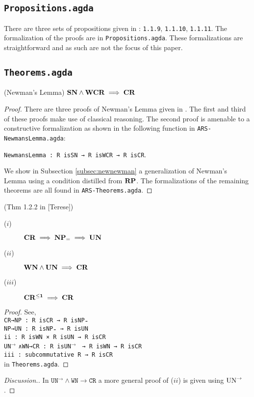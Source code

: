 \subsection{\texttt{Propositions.agda}}
There are three sets of propositions given in \terese: \texttt{1.1.9}, \texttt{1.1.10}, \texttt{1.1.11}.
The formalization of the proofs are in \texttt{Propositions.agda}. These formalizations are straightforward
and as such are not the focus of this paper.

\subsection{\texttt{Theorems.agda}} \label{subsec:theorems}

\begin{theorem}(Newman's Lemma)
  $\mathbf{SN} \land \mathbf{WCR} \implies \mathbf{CR}$
\end{theorem}

\begin{proof}
  There are three proofs of Newman's Lemma given in \terese.
  The first and third of these proofs make use of classical reasoning. The second proof is amenable to a
  constructive formalization as shown in the following function in \texttt{ARS-NewmansLemma.agda}:

  \verb|NewmansLemma : R isSN → R isWCR → R isCR|.

  We show in Subsection \ref{subsec:newnewman} a generalization of Newman's Lemma using a condition distilled from $\mathbf{RP}$.
  The formalizations of the remaining theorems are all found in \texttt{ARS-Theorems.agda}.
\end{proof}

\begin{theorem}(Thm 1.2.2 in [Terese])
\begin{description}
  \item[($i$)] $\mathbf{CR} \implies \mathbf{NP_=} \implies \mathbf{UN}$
  \item[($ii$)] $\mathbf{WN} \land \mathbf{UN} \implies \mathbf{CR}$
  \item[($iii$)] $\mathbf{CR^{\le 1}} \implies \mathbf{CR}$
\end{description}
\end{theorem}

\begin{proof}
    See, \\
    \verb|CR→NP : R isCR → R isNP₌|\\
    \verb|NP→UN : R isNP₌ → R isUN|\\
    \verb|ii : R isWN × R isUN → R isCR|\\
    \verb||\texttt{UN}$^{\to}$ \verb|∧WN→CR : R |\texttt{isUN}$^{\to}$ \verb| → R isWN → R isCR|\\
    \verb|iii : subcommutative R → R isCR|\\
    in \texttt{Theorems.agda}.
\end{proof}
\begin{proof}[Discussion.]
    In $\mathtt{UN^{→}∧WN→CR}$ a more general proof of ($ii$) is given using $\mathrm{UN}^{\to}$.
\end{proof}

